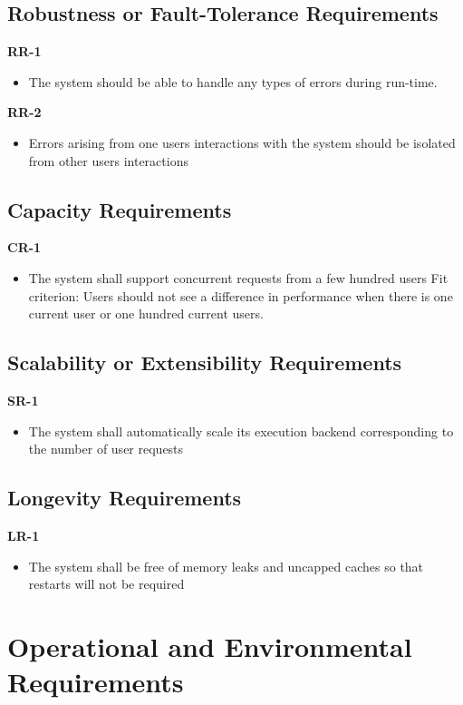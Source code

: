 \documentclass[12pt]{article}
\begin{document}
\subsection{Robustness or Fault-Tolerance Requirements}
\textbf{RR-1}
\begin{itemize}
    \item The system should be able to handle any types of errors during run-time.
\end{itemize}
\textbf{RR-2}
\begin{itemize}
    \item Errors arising from one users interactions with the system should be isolated from other users interactions
\end{itemize}

\subsection{Capacity Requirements}
\textbf{CR-1}
\begin{itemize}
    \item The system shall support concurrent requests from a few hundred users \hfill \break
    Fit criterion: Users should not see a difference in performance when there is one current user or one hundred current users.
\end{itemize}

\subsection{Scalability or Extensibility Requirements}
\textbf{SR-1}
\begin{itemize}
    \item The system shall automatically scale its execution backend corresponding to the number of user requests
\end{itemize}

\subsection{Longevity Requirements}
\textbf{LR-1}
\begin{itemize}
    \item The system shall be free of memory leaks and uncapped caches so that restarts will not be required
\end{itemize}

\section{Operational and Environmental Requirements}
\end{document}
